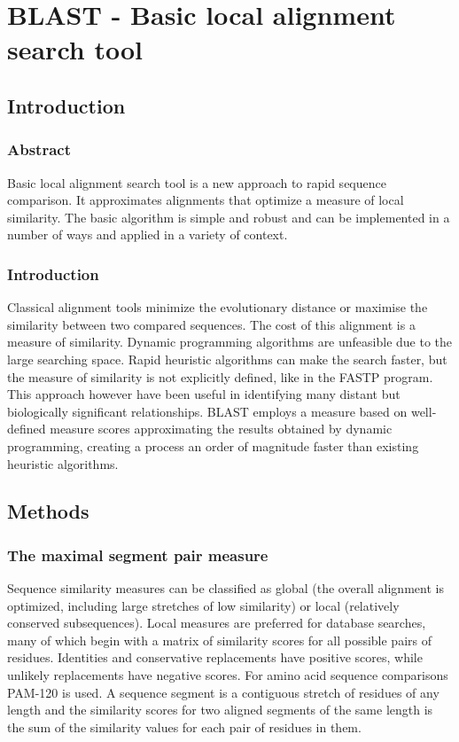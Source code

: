 \chapter{BLAST - Basic local alignment search tool}

\section{Introduction}

	\subsection{Abstract}
	Basic local alignment search tool is a new approach to rapid sequence comparison.
	It approximates alignments that optimize a measure of local similarity.
	The basic algorithm is simple and robust and can be implemented in a number of ways and applied in a variety of context.

	\subsection{Introduction}
	Classical alignment tools minimize the evolutionary distance or maximise the similarity between two compared sequences.
	The cost of this alignment is a measure of similarity.
	Dynamic programming algorithms are unfeasible due to the large searching space.
	Rapid heuristic algorithms can make the search faster, but the measure of similarity is not explicitly defined, like in the FASTP program.
	This approach however have been useful in identifying many distant but biologically significant relationships.
	BLAST employs a measure based on well-defined measure scores approximating the results obtained by dynamic programming, creating a process an order of magnitude faster than existing heuristic algorithms.

\section{Methods}

	\subsection{The maximal segment pair measure}
	Sequence similarity measures can be classified as global (the overall alignment is optimized, including large stretches of low similarity) or local (relatively conserved subsequences).
	Local measures are preferred for database searches, many of which begin with a matrix of similarity scores for all possible pairs of residues.
	Identities and conservative replacements have positive scores, while unlikely replacements have negative scores.
	For amino acid sequence comparisons PAM-120 is used.
	A sequence segment is a contiguous stretch of residues of any length and the similarity scores for two aligned segments of the same length is the sum of the similarity values for each pair of residues in them.

